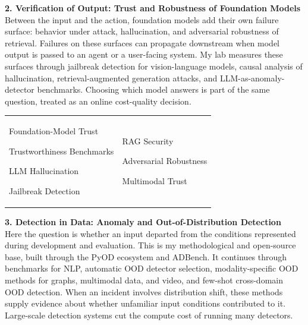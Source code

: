 \documentclass[margin,line,pifont,palatino,courier]{res}
\newenvironment{list1}{
  \begin{list}{\ding{113}}{%
      \setlength{\itemsep}{0in}
      \setlength{\parsep}{0in} \setlength{\parskip}{0in}
      \setlength{\topsep}{0in} \setlength{\partopsep}{0in}
      \setlength{\leftmargin}{0.17in}}}{\end{list}}
\begin{document}
\begin{resume}
{\color{uscred}\textbf{2. Verification of Output: Trust and Robustness of Foundation Models}}\\
Between the input and the action, foundation models add their own failure surface:
behavior under attack, hallucination, and adversarial robustness of retrieval.
Failures on these surfaces can propagate downstream when model output is passed
to an agent or a user-facing system. My lab
measures these surfaces through jailbreak detection for vision-language models,
causal analysis of hallucination, retrieval-augmented generation attacks, and
LLM-as-anomaly-detector benchmarks. Choosing which model answers is part of the
same question, treated as an online cost-quality decision.

\vspace{-0.15in}
\begin{tabular}{@{}p{}p{}}
\begin{list1}
\item Foundation-Model Trust
\item Trustworthiness Benchmarks
\item LLM Hallucination
\item Jailbreak Detection
\end{list1}
&
\begin{list1}
\item RAG Security
\item Adversarial Robustness
\item Multimodal Trust
\end{list1}
\end{tabular}


{\color{uscred}\textbf{3. Detection in Data: Anomaly and Out-of-Distribution Detection}}\\
Here the question is whether an input departed from the
conditions represented during development and evaluation. This is my
methodological and open-source base, built through the PyOD ecosystem and
ADBench. It continues through benchmarks for NLP, automatic OOD detector
selection, modality-specific OOD methods for graphs, multimodal data, and
video, and few-shot cross-domain OOD detection. When an incident involves
distribution shift, these methods supply evidence about whether unfamiliar
input conditions contributed to it. Large-scale detection systems cut the compute
cost of running many detectors.


\end{resume}
\end{document}
